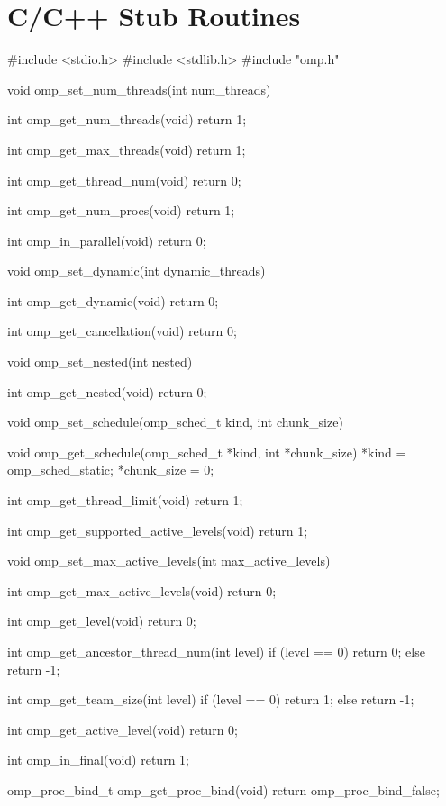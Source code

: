 \section{C/C++ Stub Routines}
\label{sec:C/C++ Stub Routines}
{\small \begin{ompcFunction}
#include <stdio.h>
#include <stdlib.h>
#include "omp.h"

void omp_set_num_threads(int num_threads)
{
}

int omp_get_num_threads(void)
{
  return 1;
}

int omp_get_max_threads(void)
{
  return 1;
}

int omp_get_thread_num(void)
{
  return 0;
}

int omp_get_num_procs(void)
{
  return 1;
}

int omp_in_parallel(void)
{
  return 0;
}

void omp_set_dynamic(int dynamic_threads)
{
}

int omp_get_dynamic(void)
{
  return 0;
}

int omp_get_cancellation(void)
{
  return 0;
}

void omp_set_nested(int nested)
{
}

int omp_get_nested(void)
{
  return 0;
}

void omp_set_schedule(omp_sched_t kind, int chunk_size)
{
}

void omp_get_schedule(omp_sched_t *kind, int *chunk_size)
{
  *kind = omp_sched_static;
  *chunk_size = 0;
}

int omp_get_thread_limit(void)
{
  return 1;
}

int omp_get_supported_active_levels(void)
{
  return 1;
}

void omp_set_max_active_levels(int max_active_levels)
{
}

int omp_get_max_active_levels(void)
{
  return 0;
}

int omp_get_level(void)
{
  return 0;
}

int omp_get_ancestor_thread_num(int level)
{
  if (level == 0)
  {
    return 0;
  }
  else
  {
    return -1;
  }
}

int omp_get_team_size(int level)
{
  if (level == 0)
  {
    return 1;
  }
  else
  {
    return -1;
  }
}

int omp_get_active_level(void)
{
  return 0;
}

int omp_in_final(void)
{
  return 1;
}

omp_proc_bind_t omp_get_proc_bind(void)
{
  return omp_proc_bind_false;
}


\end{ompcFunction}}
